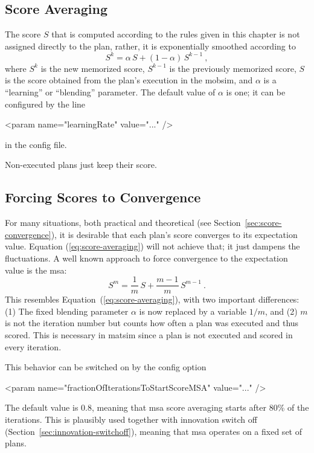 \subsection{Score Averaging}
\label{sec:score-averaging}

The score $S$ that is computed according to the rules given in this chapter is not assigned directly to the plan, rather, it is exponentially smoothed according to
\begin{equation}
S^k = \alpha \, S + (1-\alpha) \, S^{k-1} \ ,  
\label{eq:score-averaging}
\end{equation}
where $S^k$ is the new memorized score, $S^{k-1}$ is the previously memorized score, $S$ is the score obtained from the plan's execution in the \gls{mobsim}, and $\alpha$ is a ``learning'' or ``blending'' parameter.  The default value of $\alpha$ is one; it can be configured by the line
\begin{xml}
<param name="learningRate" value="..." />
\end{xml}
in the config file.

Non-executed plans just keep their score.

\subsection{Forcing Scores to Convergence}
\label{sec:score-msa}

For many situations, both practical and theoretical (see Section~\ref{sec:score-convergence}), it is desirable that each plan's score converges to its expectation value.  Equation (\ref{eq:score-averaging}) will not achieve that; it just dampens the fluctuations.  A well known approach to force convergence to the expectation value is the \gls{msa}: 
\begin{equation}
S^m = \frac{1}{m} \, S + \frac{m-1}{m} \, S^{m-1} \ .
\label{eq:score-msa}
\end{equation}
This resembles Equation~(\ref{eq:score-averaging}), with two important differences: (1) The fixed blending parameter $\alpha$ is now replaced by a variable $1/m$, and (2) $m$ is not the iteration number but counts how often a plan was executed and thus scored.  This is necessary in \gls{matsim} since a plan is not executed and scored in every iteration.

This behavior can be switched on by the config option
\begin{xml}
<param name="fractionOfIterationsToStartScoreMSA" value="..." />
\end{xml}
The default value is 0.8, meaning that \gls{msa} score averaging starts after 80\% of the iterations.  This is plausibly used together with innovation switch off (Section~\ref{sec:innovation-switchoff}), meaning that \gls{msa} operates on a fixed set of plans.




